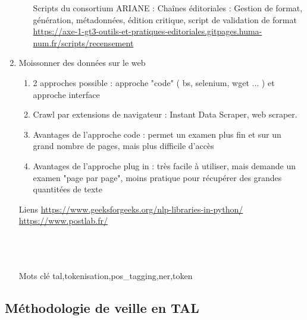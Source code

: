 \documentclass{book}
\begin{document}
\begin{enumerate}
\begin{enumerate}
            \item [Scripts du consortium ARIANE] : Chaînes éditoriales : Gestion de format, génération, métadonnées, édition critique, script de validation de format \url{https://axe-1-gt3-outils-et-pratiques-editoriales.gitpages.huma-num.fr/scripts/recensement}
        \end{enumerate}
    \item Moissonner des données sur le web
        \begin{enumerate}
            \item 2 approches possible : approche "code" ( bs, selenium, wget ... ) et approche interface 
            \item Crawl par extensions de navigateur : Instant Data Scraper, web scraper.
            \item Avantages de l'approche code : permet un examen plus fin et sur un grand nombre de pages, mais plus difficile d'accès
            \item Avantages de l'approche plug in : très facile à utiliser, mais demande un examen "page par page", moins pratique pour récupérer des grandes quantitées de texte
        \end{enumerate}
\end{enumerate}

\begin{itemize}
    \item [Liens]
        \url{https://www.geeksforgeeks.org/nlp-libraries-in-python/}%
        \url{https://www.postlab.fr/}\\
        \autocite{webster1992tokenization} \\%
        \autocite{straka-strakova-2017-tokenizing}\\%
        \autocite{sun2018overview}\\%
    \item [Mots clé]
        \gls{tal},\gls{tokenisation},\gls{pos_tagging},\gls{ner},\gls{token}
\end{itemize}



\subsection*{Méthodologie de veille en TAL}
\end{document}
